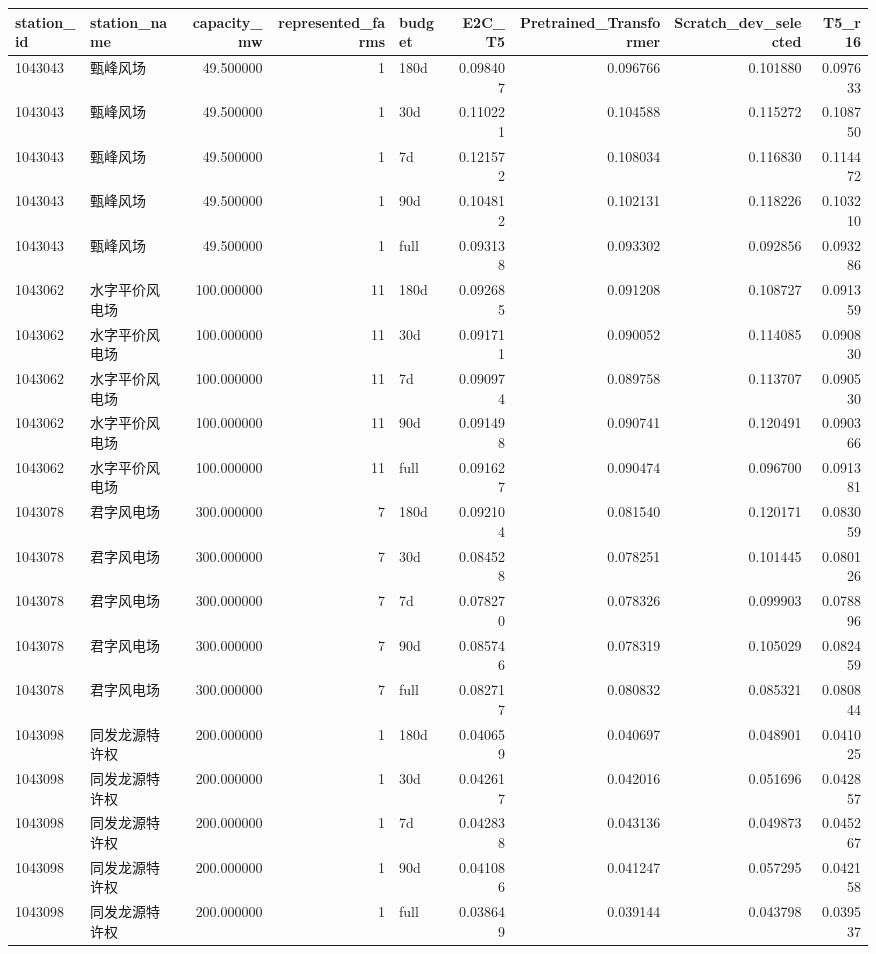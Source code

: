 \begin{tabular}{llrrlrrrr}
\toprule
station\_id & station\_name & capacity\_mw & represented\_farms & budget & E2C\_T5 & Pretrained\_Transformer & Scratch\_dev\_selected & T5\_r16 \\
\midrule
1043043 & 甄峰风场 & 49.500000 & 1 & 180d & 0.098407 & 0.096766 & 0.101880 & 0.097633 \\
1043043 & 甄峰风场 & 49.500000 & 1 & 30d & 0.110221 & 0.104588 & 0.115272 & 0.108750 \\
1043043 & 甄峰风场 & 49.500000 & 1 & 7d & 0.121572 & 0.108034 & 0.116830 & 0.114472 \\
1043043 & 甄峰风场 & 49.500000 & 1 & 90d & 0.104812 & 0.102131 & 0.118226 & 0.103210 \\
1043043 & 甄峰风场 & 49.500000 & 1 & full & 0.093138 & 0.093302 & 0.092856 & 0.093286 \\
1043062 & 水字平价风电场 & 100.000000 & 11 & 180d & 0.092685 & 0.091208 & 0.108727 & 0.091359 \\
1043062 & 水字平价风电场 & 100.000000 & 11 & 30d & 0.091711 & 0.090052 & 0.114085 & 0.090830 \\
1043062 & 水字平价风电场 & 100.000000 & 11 & 7d & 0.090974 & 0.089758 & 0.113707 & 0.090530 \\
1043062 & 水字平价风电场 & 100.000000 & 11 & 90d & 0.091498 & 0.090741 & 0.120491 & 0.090366 \\
1043062 & 水字平价风电场 & 100.000000 & 11 & full & 0.091627 & 0.090474 & 0.096700 & 0.091381 \\
1043078 & 君字风电场 & 300.000000 & 7 & 180d & 0.092104 & 0.081540 & 0.120171 & 0.083059 \\
1043078 & 君字风电场 & 300.000000 & 7 & 30d & 0.084528 & 0.078251 & 0.101445 & 0.080126 \\
1043078 & 君字风电场 & 300.000000 & 7 & 7d & 0.078270 & 0.078326 & 0.099903 & 0.078896 \\
1043078 & 君字风电场 & 300.000000 & 7 & 90d & 0.085746 & 0.078319 & 0.105029 & 0.082459 \\
1043078 & 君字风电场 & 300.000000 & 7 & full & 0.082717 & 0.080832 & 0.085321 & 0.080844 \\
1043098 & 同发龙源特许权 & 200.000000 & 1 & 180d & 0.040659 & 0.040697 & 0.048901 & 0.041025 \\
1043098 & 同发龙源特许权 & 200.000000 & 1 & 30d & 0.042617 & 0.042016 & 0.051696 & 0.042857 \\
1043098 & 同发龙源特许权 & 200.000000 & 1 & 7d & 0.042838 & 0.043136 & 0.049873 & 0.045267 \\
1043098 & 同发龙源特许权 & 200.000000 & 1 & 90d & 0.041086 & 0.041247 & 0.057295 & 0.042158 \\
1043098 & 同发龙源特许权 & 200.000000 & 1 & full & 0.038649 & 0.039144 & 0.043798 & 0.039537 \\
\bottomrule
\end{tabular}
